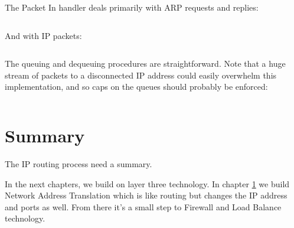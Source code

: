 \inputminted[firstline=97,lastline=115]{python}{code/routing/router_handler.py} 

The Packet In handler deals primarily with ARP requests and replies:

\inputminted[firstline=117,lastline=156]{python}{code/routing/router_handler.py} 

And with IP packets:

\inputminted[firstline=158]{python}{code/routing/router_handler.py} 

The queuing and dequeuing procedures are straightforward.  Note that a huge stream of packets to a 
disconnected IP address could easily overwhelm this implementation, and so caps on the queues should
probably be enforced:

\inputminted[firstline=57,lastline=96]{python}{code/routing/router_handler.py} 

\section{Summary}

The IP routing process need a summary.  

In the next chapters, we build on layer three technology.  In chapter \ref{} we build Network Address Translation
which is like routing but changes the IP address and ports as well.  From there it's a small step to 
Firewall and Load Balance technology.  
